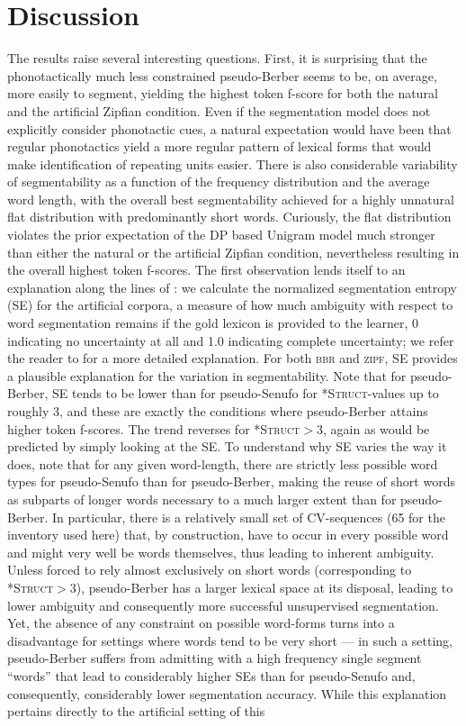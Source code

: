 \documentclass[11pt]{article}
\begin{document}
\section{Discussion}
\vspace*{-5pt}
The results raise several interesting questions. First, it is surprising that the phonotactically much less constrained pseudo-Berber seems to be, on average, more easily to segment, yielding the highest token f-score for both the natural and the artificial Zipfian condition. Even if the segmentation model does not explicitly consider phonotactic cues, a natural expectation would have been that regular phonotactics yield a more regular pattern of lexical forms that would make identification of repeating units easier. There is also considerable variability of segmentability as a function of the frequency distribution and the average word length, with the overall best segmentability achieved for a highly unnatural flat distribution with predominantly short words. Curiously, the flat distribution violates the prior expectation of the DP based Unigram model much stronger than either the natural or the artificial Zipfian condition, nevertheless resulting in the overall highest token f-scores. The first observation lends itself to an explanation along the lines of \cite{Fourtassi13a}: we calculate the normalized segmentation entropy (SE) for the artificial corpora, a measure of how much ambiguity with respect to word segmentation remains if the gold lexicon is provided to the learner, 0 indicating no uncertainty at all and 1.0 indicating complete uncertainty; we refer the reader to \cite{Fourtassi13a} for a more detailed explanation. For both \textsc{bbr} and \textsc{zipf}, SE provides a plausible explanation for the variation in segmentability. Note that for pseudo-Berber, SE tends to be lower than for pseudo-Senufo for \textsc{*Struct}-values up to roughly 3, and these are exactly the conditions where pseudo-Berber attains higher token f-scores. The trend reverses for \textsc{*Struct}$>$3, again as would be predicted by simply looking at the SE. To understand why SE varies the way it does, note that for any given word-length, there are strictly less possible word types for pseudo-Senufo than for pseudo-Berber, making the reuse of short words as subparts of longer words necessary to a much larger extent than for pseudo-Berber. In particular, there is a relatively small set of CV-sequences (65 for the inventory used here) that, by construction, have to occur in every possible word and might very well be words themselves, thus leading to inherent ambiguity. Unless forced to rely almost exclusively on short words (corresponding to \textsc{*Struct}$>$3), pseudo-Berber has a larger lexical space at its disposal, leading to lower ambiguity and consequently more successful unsupervised segmentation. Yet, the absence of any constraint on possible word-forms turns into a disadvantage for settings where words tend to be very short --- in such a setting, pseudo-Berber suffers from admitting with a high frequency single segment ``words'' that lead to considerably higher SEs than for pseudo-Senufo and, consequently, considerably lower segmentation accuracy. While this explanation pertains directly to the artificial setting of this 
\end{document}
